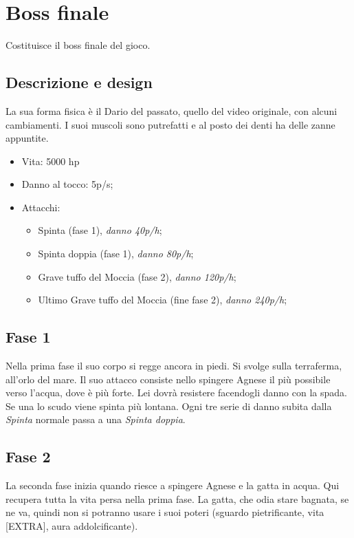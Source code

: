 \section{Boss finale}
    Costituisce il boss finale del gioco.
        
    \subsection{Descrizione e design}
        La sua forma fisica è il Dario del passato, quello del video originale, con alcuni cambiamenti.
        I suoi muscoli sono putrefatti e al posto dei denti ha delle zanne appuntite.\\        
        \begin{itemize}
            \item{Vita: 5000 hp}
            \item{Danno al tocco: 5p/s;}
            \item{Attacchi:
                \begin{itemize}
                    \item{Spinta (fase 1), \emph{danno 40p/h};}
                    \item{Spinta doppia (fase 1), \emph{danno 80p/h};}
                    \item{Grave tuffo del Moccia (fase 2), \emph{danno 120p/h};}
                    \item{Ultimo Grave tuffo del Moccia (fine fase 2), \emph{danno 240p/h};}
                \end{itemize}
            }
        \end{itemize}
    
    \subsection{Fase 1}
        Nella prima fase il suo corpo si regge ancora in piedi. Si svolge sulla terraferma, all'orlo del mare.
        Il suo attacco consiste nello spingere Agnese il più possibile verso l'acqua, dove è più forte. Lei dovrà
        resistere facendogli danno con la spada. Se una lo scudo viene spinta più lontana. Ogni tre serie di danno subita
        dalla \emph{Spinta} normale passa a una \emph{Spinta doppia}.
    
    \subsection{Fase 2}
        La seconda fase inizia quando riesce a spingere Agnese e la gatta in acqua. Qui recupera tutta la vita persa
        nella prima fase. La gatta, che odia stare bagnata, se ne va, quindi non si potranno usare i suoi poteri (sguardo
        pietrificante, vita [EXTRA], aura addolcificante).

